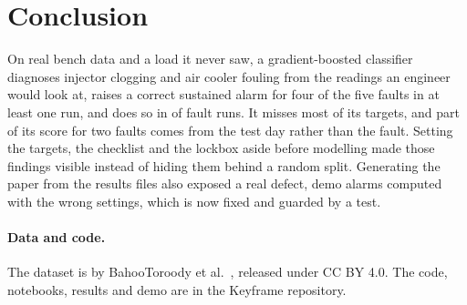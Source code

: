 \documentclass[10pt]{article}
\newcommand{\kf}{Keyframe}
\begin{document}
\section{Conclusion}

On real bench data and a load it never saw, a gradient-boosted classifier diagnoses injector clogging and air cooler fouling from the readings an engineer would look at, raises a correct sustained alarm for four of the five faults in at least one run, and does so in \AlarmDetected{} of \AlarmRuns{} fault runs. It misses most of its targets, and part of its score for two faults comes from the test day rather than the fault. Setting the targets, the checklist and the lockbox aside before modelling made those findings visible instead of hiding them behind a random split. Generating the paper from the results files also exposed a real defect, demo alarms computed with the wrong settings, which is now fixed and guarded by a test.

\paragraph{Data and code.} The dataset is by BahooToroody et al.~\cite{bahootoroody2026dataset,bahootoroody2026descriptor}, released under CC BY 4.0. The code, notebooks, results and demo are in the \kf{} repository.



\end{document}

